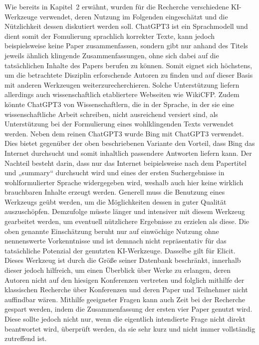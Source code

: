Wie bereits in Kapitel 2 erwähnt, wurden für die Recherche verschiedene KI-Werkzeuge verwendet, deren Nutzung im Folgenden 
eingeschätzt und die Nützlichkeit dessen diskutiert werden soll. 
ChatGPT3 ist ein Sprachmodell und dient somit der Fomulierung sprachlich korrekter Texte, kann jedoch beispielsweise keine Paper 
zusammenfassen, sondern gibt nur anhand des Titels jeweils ähnlich klingende Zusammenfassungen, ohne sich dabei auf die tatsächlichen 
Inhalte des Papers berufen zu können. Somit eignet sich höchstens, um die betrachtete Disziplin erforschende Autoren zu finden 
und auf dieser Basis mit anderen Werkzeugen weiterzurecherchieren. Solche Unterstützung liefern allerdings auch wissenschaftlich
etabliertere Webseiten wie WikiCFP. Zudem könnte ChatGPT3 von Wissenschaftlern, die in der Sprache, in der sie eine wissenschaftliche 
Arbeit schreiben, nicht ausreichend versiert sind, als Unterstützung bei der Formulierung eines wohlklingenden Texts verwendet werden.
Neben dem reinen ChatGPT3 wurde Bing mit ChatGPT3 verwendet. Dies bietet gegenüber der oben beschriebenen Variante den Vorteil, 
dass Bing das Internet durchsucht und somit inhaltlich passendere Antworten liefern kann. Der Nachteil besteht darin, dass nur das 
Internet beipielsweise nach dem Papertitel und „summary“ durchsucht wird und eines der ersten Suchergebnisse in wohlformulierter 
Sprache widergegeben wird, weshalb auch hier keine wirklich brauchbaren Inhalte erzeugt werden.
Generell muss die Benutzung eines Werkzeugs geübt werden, um die Möglichkeiten dessen in guter Qualität auszuschöpfen. Demzufolge 
müsste länger und intensiver mit diesem Werkzeug gearbeitet werden, um eventuell nützlichere Ergebnisse zu erzielen als diese. Die 
oben genannte Einschätzung beruht nur auf einwöchige Nutzung ohne nennenswerte Vorkenntnisse und ist demnach nicht repräsentativ für 
das tatsächliche Potenzial der genutzten KI-Werkzeuge.
Dasselbe gilt für Elicit. Dieses Werkzeug ist durch die Größe seiner Datenbank beschränkt, innerhalb dieser jedoch hilfreich, um 
einen Überblick über Werke zu erlangen, deren Autoren nicht auf den hiesigen Konferenzen vertreten und folglich mithilfe der 
klassischen Recherche über Konferenzen und deren Paper und Teilnehmer nicht auffindbar wären. Mithilfe geeigneter Fragen kann 
auch Zeit bei der Recherche gespart werden, indem die Zusammenfassung der ersten vier Paper genutzt wird. Diese sollte jedoch 
nicht nur, wenn die eigentlich intendierte Frage nicht direkt beantwortet wird, überprüft werden, da sie sehr kurz und nicht 
immer vollständig zutreffend ist.

